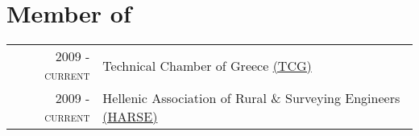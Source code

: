 \documentclass[9pt]{extarticle} %
\begin{document}
\section{Member of}
\begin{longtable}{rp{13cm}}
\textsc{2009 - current} & Technical Chamber of Greece \href{http://web.tee.gr/}{(TCG)}\\
\textsc{2009 - current} & Hellenic Association of Rural \& Surveying Engineers \href{http://www.psdatm.gr/}{(HARSE)}\\
\end{longtable}
\medskip

\end{document}
